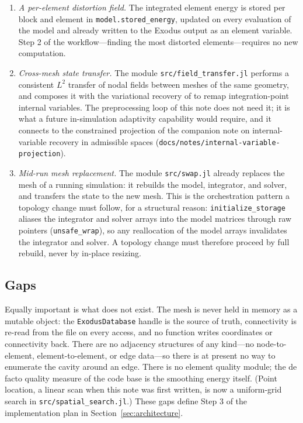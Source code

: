 \documentclass[11pt]{article}
\newcommand{\code}[1]{\texttt{#1}}
\begin{document}
\begin{enumerate}[itemsep=2pt]
\item \emph{A per-element distortion field.} The integrated element
  energy is stored per block and element in
  \code{model.stored\_energy}, updated on every evaluation of the model
  and already written to the Exodus output as an element variable. Step 2 of the workflow---finding
  the most distorted elements---requires no new computation.
\item \emph{Cross-mesh state transfer.} The module
  \code{src/field\_transfer.jl} performs a consistent $L^2$ transfer of
  nodal fields between meshes of the same geometry, and composes it
  with the variational recovery of \cite{mota2013} to remap
  integration-point internal variables. The preprocessing loop of this
  note does not need it; it is what a future in-simulation adaptivity
  capability would require, and it connects to the constrained
  projection of the companion note on internal-variable recovery in
  admissible spaces (\code{docs/notes/internal-variable-projection}).
\item \emph{Mid-run mesh replacement.} The module \code{src/swap.jl}
  already replaces the mesh of a running simulation: it rebuilds the
  model, integrator, and solver, and transfers the state to the new
  mesh. This is the orchestration pattern a topology change must follow,
  for a structural reason: \code{initialize\_storage} aliases the
  integrator and solver arrays into the model matrices through raw
  pointers (\code{unsafe\_wrap}), so any reallocation of the model
  arrays invalidates the integrator and solver. A topology change must
  therefore proceed by full rebuild, never by in-place resizing.
\end{enumerate}

\subsection{Gaps}

Equally important is what does not exist. The mesh is never held in
memory as a mutable object: the \code{ExodusDatabase} handle is the
source of truth, connectivity is re-read from the file on every access,
and no function writes coordinates or connectivity back. There are no
adjacency structures of any kind---no node-to-element, element-to-element,
or edge data---so there is at present no way to enumerate the cavity
around an edge. There is no element quality module; the de facto quality
measure of the code base is the smoothing energy itself. (Point
location, a linear scan when this note was first written, is now a
uniform-grid search in \code{src/spatial\_search.jl}.) These gaps
define Step 3 of the implementation plan in
Section~\ref{sec:architecture}.
\end{document}
